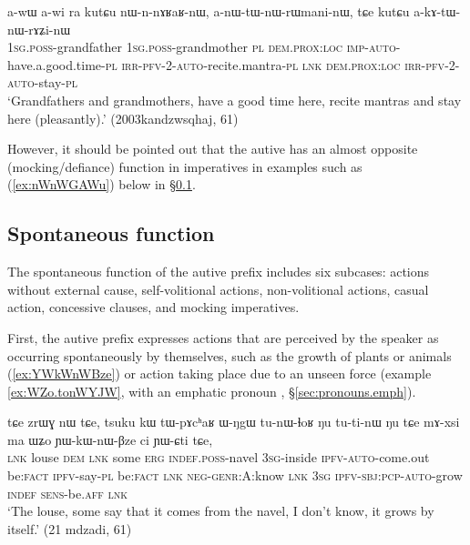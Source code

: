 \begin{exe}
\ex \label{ex:anWtWnWrWmaninW}
\gll a-wɯ a-wi ra kutɕu nɯ-n-nɤʁaʁ-nɯ, a-nɯ-tɯ-nɯ-rɯmani-nɯ, tɕe kutɕu a-kɤ-tɯ-nɯ-rɤʑi-nɯ \\
\textsc{1sg}.\textsc{poss}-grandfather \textsc{1sg}.\textsc{poss}-grandmother \textsc{pl} \textsc{dem}.\textsc{prox}:\textsc{loc} \textsc{imp}-\textsc{auto}-have.a.good.time-\textsc{pl} \textsc{irr}-\textsc{pfv}-2-\textsc{auto}-recite.mantra-\textsc{pl} \textsc{lnk} \textsc{dem}.\textsc{prox}:\textsc{loc} \textsc{irr}-\textsc{pfv}-2-\textsc{auto}-stay-\textsc{pl} \\
\glt `Grandfathers and grandmothers, have a good time here, recite mantras and stay here (pleasantly).' (2003kandzwsqhaj, 61)
\end{exe}

However, it should be pointed out that the autive has an almost opposite (mocking/defiance) function in imperatives in examples such as (\ref{ex:nWnWGAWu}) below in §\ref{sec:autoben.spontaneous}.
 
\subsection{Spontaneous function}  \label{sec:autoben.spontaneous} 
The spontaneous function of the autive prefix includes six subcases: actions without external cause, self-volitional actions, non-volitional actions, casual action, concessive clauses,  and mocking imperatives.

First, the autive prefix expresses actions that are perceived by the speaker as occurring spontaneously by themselves, such as the growth of plants or animals (\ref{ex:YWkWnWBze}) or action taking place due to an unseen force (example \ref{ex:WZo.tonWYJW}, with an emphatic pronoun , §\ref{sec:pronouns.emph}).

\begin{exe}
\ex \label{ex:YWkWnWBze}
\gll tɕe zrɯɣ nɯ tɕe, tsuku kɯ tɯ-pɤcʰaʁ ɯ-ŋgɯ tu-nɯ-ɬoʁ ŋu tu-ti-nɯ ŋu tɕe mɤ-xsi ma ɯʑo ɲɯ-kɯ-nɯ-βze ci ɲɯ-ɕti tɕe, 	\\
\textsc{lnk} louse \textsc{dem} \textsc{lnk} some \textsc{erg} \textsc{indef}.\textsc{poss}-navel \textsc{3sg}-inside \textsc{ipfv}-\textsc{auto}-come.out be:\textsc{fact} \textsc{ipfv}-say-\textsc{pl}  be:\textsc{fact} \textsc{lnk} \textsc{neg}-\textsc{genr}:A:know \textsc{lnk} \textsc{3sg} \textsc{ipfv}-\textsc{sbj}:\textsc{pcp}-\textsc{auto}-grow \textsc{indef} \textsc{sens}-be.\textsc{aff} \textsc{lnk} \\
\glt `The louse, some say that it comes from the navel, I don't know, it grows by itself.' (21 mdzadi, 61)
\end{exe}

